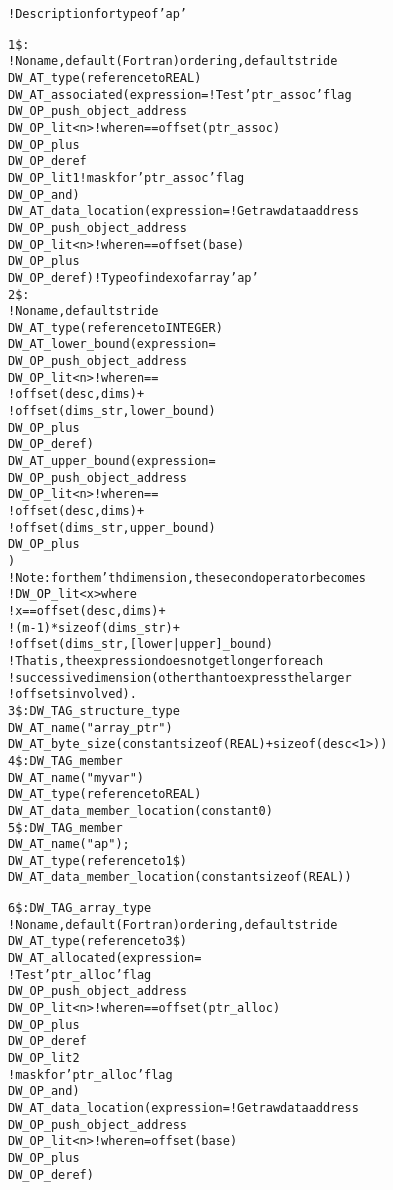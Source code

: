 \begin{alltt}
! Description for type of 'ap'

1\$: 
        ! No name, default (Fortran) ordering, default stride
        DW\_AT\_type(reference to REAL)
        DW\_AT\_associated(expression= ! Test 'ptr\_assoc' flag
            DW\_OP\_push\_object\_address
            DW\_OP\_lit<n> ! where n == offset(ptr\_assoc)
            DW\_OP\_plus
            DW\_OP\_deref
            DW\_OP\_lit1 ! mask for 'ptr\_assoc' flag
            DW\_OP\_and)
        DW\_AT\_data\_location(expression= ! Get raw data address
            DW\_OP\_push\_object\_address
            DW\_OP\_lit<n> ! where n == offset(base)
            DW\_OP\_plus
            DW\_OP\_deref) ! Type of index of array 'ap'
2\$:     
        ! No name, default stride
        DW\_AT\_type(reference to INTEGER)
        DW\_AT\_lower\_bound(expression=
        DW\_OP\_push\_object\_address
            DW\_OP\_lit<n> ! where n ==
                         !  offset(desc, dims) +
                         !  offset(dims\_str, lower\_bound)
            DW\_OP\_plus
            DW\_OP\_deref)
        DW\_AT\_upper\_bound(expression=
            DW\_OP\_push\_object\_address
            DW\_OP\_lit<n> ! where n ==
                         !  offset(desc, dims) +
                         !  offset(dims\_str, upper\_bound)
            DW\_OP\_plus
            )
        !  Note: for the m'th dimension, the second operator becomes
        !  DW\_OP\_lit<x> where
        !  x == offset(desc, dims) +
        !  (m-1)*sizeof(dims\_str) +
        !  offset(dims\_str, [lower|upper]\_bound)
        !  That is, the expression does not get longer for each
        !  successive dimension (other than to express the larger
        !  offsets involved).
3\$: DW\_TAG\_structure\_type
        DW\_AT\_name("array\_ptr")
        DW\_AT\_byte\_size(constant sizeof(REAL) + sizeof(desc<1>))
4\$:     DW\_TAG\_member
            DW\_AT\_name("myvar")
            DW\_AT\_type(reference to REAL)
            DW\_AT\_data\_member\_location(constant 0)
5\$:     DW\_TAG\_member
            DW\_AT\_name("ap");
            DW\_AT\_type(reference to 1\$)
            DW\_AT\_data\_member\_location(constant sizeof(REAL))

6\$: DW\_TAG\_array\_type
        ! No name, default (Fortran) ordering, default stride
        DW\_AT\_type(reference to 3\$)
        DW\_AT\_allocated(expression=
             ! Test 'ptr\_alloc' flag
            DW\_OP\_push\_object\_address
            DW\_OP\_lit<n> ! where n == offset(ptr\_alloc)
            DW\_OP\_plus
            DW\_OP\_deref
            DW\_OP\_lit2
             ! mask for 'ptr\_alloc' flag
            DW\_OP\_and)
        DW\_AT\_data\_location(expression= ! Get raw data address
            DW\_OP\_push\_object\_address
            DW\_OP\_lit<n> ! where n = offset(base)
            DW\_OP\_plus
            DW\_OP\_deref)


\end{alltt}
